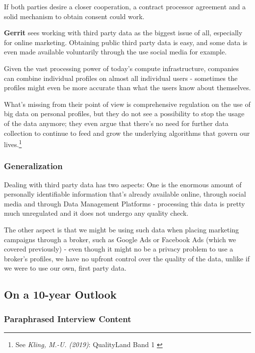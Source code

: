 If both parties desire a closer cooperation, a contract processor agreement and a solid mechanism to obtain consent could work.

\textbf{Gerrit} sees working with third party data as the biggest issue of all, especially for online marketing. Obtaining public third party data is easy, and some data is even made available voluntarily through the use social media for example.

Given the vast processing power of today's compute infrastructure, companies can combine individual profiles on almost all individual users - sometimes the profiles might even be more accurate than what the users know about themselves.

What's missing from their point of view is comprehensive regulation on the use of big data on personal profiles, but they do not see a possibility to stop the usage of the data anymore; they even argue that there's no need for further data collection to continue to feed and grow the underlying algorithms that govern our lives.\footnote{See \textit{Kling, M.-U. (2019)}: QualityLand Band 1 \cite{qualityLand}}

\subsubsection{Generalization}

Dealing with third party data has two aspects: One is the enormous amount of personally identifiable information that's already available online, through social media and through Data Management Platforms - processing this data is pretty much unregulated and it does not undergo any quality check.

The other aspect is that we might be using such data when placing marketing campaigns through a broker, such as Google Ads or Facebook Ads (which we covered previously) - even though it might no be a privacy problem to use a broker's profiles, we have no upfront control over the quality of the data, unlike if we were to use our own, first party data.

\subsection{On a 10-year Outlook}

\subsubsection{Paraphrased Interview Content}

